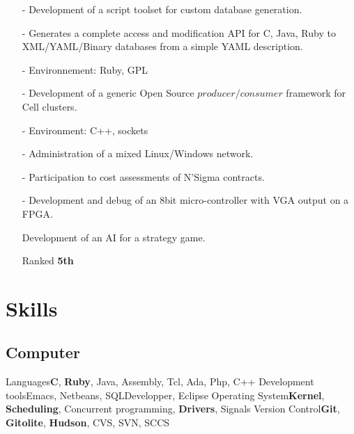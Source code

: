 \documentclass[10pt,a4paper]{moderncv}
\begin{document}
{
\begin{itemize}
\item[-]{Development of a script toolset for custom database generation.}
\item[-]{Generates a complete access and modification API for C, Java, Ruby to XML/YAML/Binary databases from a simple YAML description.}
\item[-]{Environnement: Ruby, GPL}
\end{itemize}
}
{
\begin{itemize}
\item[-]{Development of a generic Open Source $producer/consumer$ framework for Cell clusters.}
\item[-]{Environment: C++, sockets}
\end{itemize}
}
{
\begin{itemize}
\item[-]{Administration of a mixed Linux/Windows network.}
\item[-]{Participation to cost assessments of N'Sigma contracts.}
\end{itemize}
}

{
\begin{itemize}
\item[-]{Development and debug of an 8bit micro-controller with VGA output on a FPGA.}
\end{itemize}
}

{
\begin{itemize}
\item[]{Development of an AI for a strategy game.}
\item[]{Ranked \textbf{5th}}
\end{itemize}
}

\section{Skills}
\subsection{Computer}
\cvcomputer
{Languages}{\textbf{C}, \textbf{Ruby}, Java, Assembly, Tcl, Ada, Php, C++}
{Development tools}{Emacs, Netbeans, SQLDevelopper, Eclipse}
\cvcomputer
{Operating System}{\textbf{Kernel}, \textbf{Scheduling}, Concurrent programming, \textbf{Drivers}, Signals}
{Version Control}{\textbf{Git}, \textbf{Gitolite}, \textbf{Hudson}, CVS, SVN, SCCS}
\end{document}
